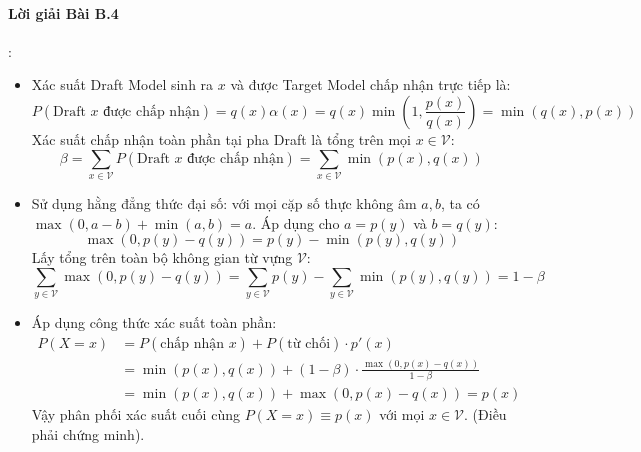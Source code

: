 \paragraph{Lời giải Bài B.4}:
\begin{itemize}
  \item[a)] Xác suất Draft Model sinh ra $x$ và được Target Model chấp nhận trực tiếp là:
  \begin{equation*}
  P(\text{Draft } x \text{ được chấp nhận}) = q(x) \alpha(x) = q(x) \min\left(1, \frac{p(x)}{q(x)}\right) = \min(q(x), p(x))
  \end{equation*}
  Xác suất chấp nhận toàn phần tại pha Draft là tổng trên mọi $x \in \mathcal{V}$:
  \begin{equation*}
  \beta = \sum_{x \in \mathcal{V}} P(\text{Draft } x \text{ được chấp nhận}) = \sum_{x \in \mathcal{V}} \min(p(x), q(x))
  \end{equation*}

  \item[b)] Sử dụng hằng đẳng thức đại số: với mọi cặp số thực không âm $a, b$, ta có $\max(0, a - b) + \min(a, b) = a$.
  Áp dụng cho $a = p(y)$ và $b = q(y)$:
  \begin{equation*}
  \max(0, p(y) - q(y)) = p(y) - \min(p(y), q(y))
  \end{equation*}
  Lấy tổng trên toàn bộ không gian từ vựng $\mathcal{V}$:
  \begin{equation*}
  \sum_{y \in \mathcal{V}} \max(0, p(y) - q(y)) = \sum_{y \in \mathcal{V}} p(y) - \sum_{y \in \mathcal{V}} \min(p(y), q(y)) = 1 - \beta
  \end{equation*}

  \item[c)] Áp dụng công thức xác suất toàn phần:
  \begin{align*}
  P(X = x) &= P(\text{chấp nhận } x) + P(\text{từ chối}) \cdot p'(x) \\
  &= \min(p(x), q(x)) + (1 - \beta) \cdot \frac{\max(0, p(x) - q(x))}{1 - \beta} \\
  &= \min(p(x), q(x)) + \max(0, p(x) - q(x)) = p(x)
  \end{align*}
  Vậy phân phối xác suất cuối cùng $P(X = x) \equiv p(x)$ với mọi $x \in \mathcal{V}$. (Điều phải chứng minh).
\end{itemize}

